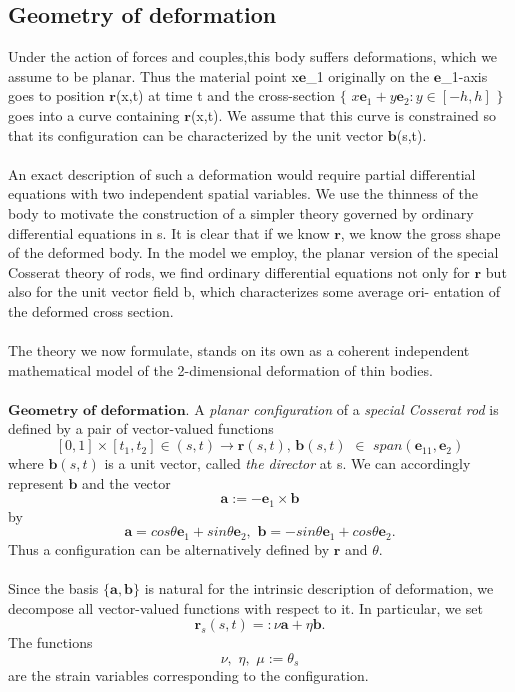 \documentclass[12pt]{article}
\begin{document}
\subsection{Geometry of deformation}
Under the action of forces and couples,this body suffers deformations, which we assume to be planar. Thus the material point x$\mathbf{e}$_1 originally on the $\mathbf{e}$_1-axis goes to position $\mathbf{r}$(x,t) at time t and the cross-section  $\{$
$x\mathbf{e}_1 + y\mathbf{e}_2:y \in[-h,h]$ 
$\}$ goes into a curve containing $\mathbf{r}$(x,t). We assume that this curve is constrained so that its configuration can be characterized by the unit vector $\mathbf{b}$(s,t).
\\\\
An exact description of such a deformation would require partial differential equations with two independent spatial variables. We use the thinness of the body to motivate the construction of a simpler theory governed by ordinary differential equations in s. It is clear that if we know $\mathbf{r}$, we know the gross shape of the deformed body. In the model we employ, the planar version of the special Cosserat theory of rods, we find ordinary differential equations not only for $\mathbf{r}$ but also for the unit vector field b, which characterizes some average ori- entation of the deformed cross section. 
\\\\
The theory we now formulate, stands on its own as a coherent independent mathematical model of the 2-dimensional deformation of thin bodies.
\\\\
$\mathbf{Geometry}\,\,\mathbf{of}\,\,\mathbf{deformation}.$ A \emph{planar configuration} of a \emph{special Cosserat rod} is defined by a pair of vector-valued functions
\[[0,1] × [t_1,t_2] \in (s,t) → \mathbf{r}(s,t),\,\mathbf{b}(s,t)\,\,\in\,\,span(\mathbf{e}_11,\mathbf{e}_2)\]
where $\mathbf{b}(s,t)$ is a unit vector, called \emph{the director} at s. We can accordingly
represent $\mathbf{b}$ and the vector 
\[ \mathbf{a} := −\mathbf{e}_1 \times \mathbf{b}\]
by 
\[ \mathbf{a}=cos\theta\mathbf{e}_1+sin\theta\mathbf{e}_2,\,\,\mathbf{b}=−sin\theta\mathbf{e}_1+cos\theta\mathbf{e}_2.\]
Thus a configuration can be alternatively defined by $\mathbf{r}$ and $\theta$.
\\\\
Since the basis $\{\mathbf{a},\mathbf{b}\}$ is natural for the intrinsic description of deformation, we decompose all vector-valued functions with respect to it. In
particular, we set
\[ \mathbf{r}_s(s,t) =: \nu\mathbf{a} + \eta\mathbf{b}. \]
The functions
\[ \nu,\,\,\eta,\,\,\mu:= \theta_s \]
are the strain variables corresponding to the configuration. 
\end{document}
